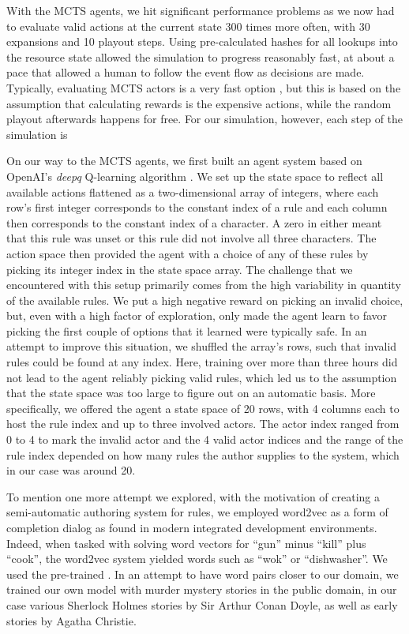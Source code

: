 With the MCTS agents, we hit significant performance problems as we now had to evaluate valid actions at the current state 300 times more often, with 30 expansions and 10 playout steps. Using pre-calculated hashes for all lookups into the resource state allowed the simulation to progress reasonably fast, at about a pace that allowed a human to follow the event flow as decisions are made. Typically, evaluating MCTS actors is a very fast option , but this is based on the assumption that calculating rewards is the expensive actions, while the random playout afterwards happens for free. For our simulation, however, each step of the simulation is 

On our way to the MCTS agents, we first built an agent system based on OpenAI's \emph{deepq} Q-learning algorithm . We set up the state space to reflect all available actions flattened as a two-dimensional array of integers, where each row's first integer corresponds to the constant index of a rule and each column then corresponds to the constant index of a character. A zero in either meant that this rule was unset or this rule did not involve all three characters. The action space then provided the agent with a choice of any of these rules by picking its integer index in the state space array. The challenge that we encountered with this setup primarily comes from the high variability in quantity of the available rules. We put a high negative reward on picking an invalid choice, but, even with a high factor of exploration, only made the agent learn to favor picking the first couple of options that it learned were typically safe. In an attempt to improve this situation, we shuffled the array's rows, such that invalid rules could be found at any index. Here, training over more than three hours did not lead to the agent reliably picking valid rules, which led us to the assumption that the state space was too large to figure out on an automatic basis. More specifically, we offered the agent a state space of 20 rows, with 4 columns each to host the rule index and up to three involved actors. The actor index ranged from 0 to 4 to mark the invalid actor and the 4 valid actor indices and the range of the rule index depended on how many rules the author supplies to the system, which in our case was around 20.

To mention one more attempt we explored, with the motivation of creating a semi-automatic authoring system for rules, we employed word2vec  as a form of completion dialog as found in modern integrated development environments.
Indeed, when tasked with solving word vectors for \enquote{gun} minus \enquote{kill} plus \enquote{cook}, the word2vec system yielded words such as \enquote{wok} or \enquote{dishwasher}.
We used the pre-trained .
In an attempt to have word pairs closer to our domain, we trained our own model with murder mystery stories in the public domain, in our case various Sherlock Holmes stories by Sir Arthur Conan Doyle, as well as early stories by Agatha Christie.

